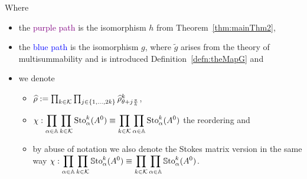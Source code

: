 \begin{center}
\end{center}
Where
\begin{itemize}
  \item the \textcolor{purple}{purple path} is the isomorphism $h$ from
    Theorem~\ref{thm:mainThm2},
  \item the \textcolor{blue}{blue path} is the isomorphism $g$, where $\tilde g$
    arises from the theory of multisummability and is introduced
    Definition~\ref{defn:theMapG} and
  \item we denote
    \begin{itemize}
      \item $\widehat\rho:=\prod_{k\in\mathcal{K}}\prod_{j\in\{1,\dots,2k\}}\widehat\rho_{\theta+j\frac{\pi}{k}}^k$,
      \item $\chi:\displaystyle \prod_{\alpha\in\mathbb{A}}\prod_{k\in\mathcal{K}}\operatorname{Sto}_\alpha^k(A^0)
        \equiv\displaystyle \prod_{k\in\mathcal{K}}\prod_{\alpha\in\mathbb{A}}\operatorname{Sto}_\alpha^k(A^0)$
        the reordering and
      \item by abuse of notation we also denote the Stokes matrix version in
        the same way
        $\chi:\displaystyle \prod_{\alpha\in\mathbb{A}}\prod_{k\in\mathcal{K}}\operatorname{\mathbb{S}to}_\alpha^k(A^0)
        \equiv\displaystyle
        \prod_{k\in\mathcal{K}}\prod_{\alpha\in\mathbb{A}}\operatorname{\mathbb{S}to}_\alpha^k(A^0)$.
    \end{itemize}
\end{itemize}

